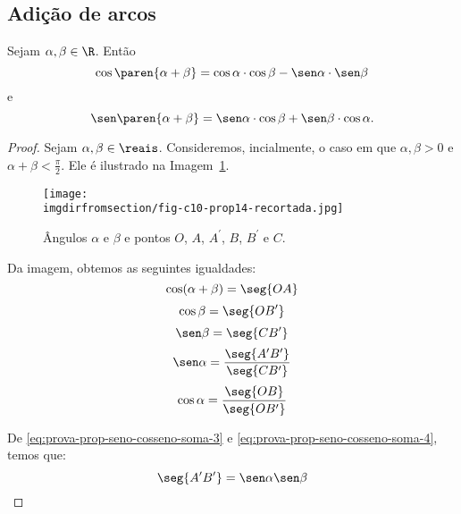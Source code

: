 \subsection{Adição de arcos}

\begin{proposition}
\label{prop:seno-e-cosseno-da-soma}
    Sejam $\alpha, \beta \in \R$. Então
$$\cos \paren{\alpha + \beta} = \cos \alpha \cdot \cos \beta - \sen
\alpha \cdot \sen \beta$$ e
$$\sen \paren{\alpha + \beta} = \sen \alpha \cdot \cos \beta +\sen \beta \cdot
\cos \alpha.$$
\end{proposition}

\begin{proof}
    Sejam $\alpha, \beta \in \reais$. Consideremos, incialmente, o caso em que 
    $\alpha,\beta>0$ e $\alpha+\beta < \frac{\pi}{2}$. Ele é ilustrado na Imagem~\ref{img:prova-seno-e-cosseno-da-soma}.
    \begin{figure}[H]
        \centering
        \texttt{[image: \\imgdirfromsection/fig-c10-prop14-recortada.jpg]}
        \caption{Ângulos $\alpha$ e $\beta$ e pontos $O$, $A$, $A^\prime$, $B$, $B^\prime$ e $C$.}
        \label{img:prova-seno-e-cosseno-da-soma}
    \end{figure}
    Da imagem, obtemos as seguintes igualdades:
    \begin{equation*}
        \cos(\alpha+\beta) = \seg{OA}
    \end{equation*}
    \begin{equation}
    \label{eq:prova-prop-seno-cosseno-soma-2}
        \cos\beta = \seg{OB^{\prime}}
    \end{equation}
    \begin{equation}
    \label{eq:prova-prop-seno-cosseno-soma-3}
        \sen\beta = \seg{CB^{\prime}}
    \end{equation} 
    \begin{equation}
    \label{eq:prova-prop-seno-cosseno-soma-4}
        \sen\alpha = \frac{\seg{A^{\prime}B^{\prime}}}{\seg{CB^{\prime}}}
    \end{equation}
    \begin{equation}
    \label{eq:prova-prop-seno-cosseno-soma-5}
        \cos\alpha = \frac{\seg{OB}}{\seg{OB^{\prime}}}
    \end{equation}

    De \ref{eq:prova-prop-seno-cosseno-soma-3} e \ref{eq:prova-prop-seno-cosseno-soma-4}, temos que:
    \begin{equation}
    \label{eq:prova-prop-seno-cosseno-soma-6}
        \seg{A^{\prime} B^{\prime}} = \sen \alpha \sen \beta
    \end{equation}


\end{proof}
